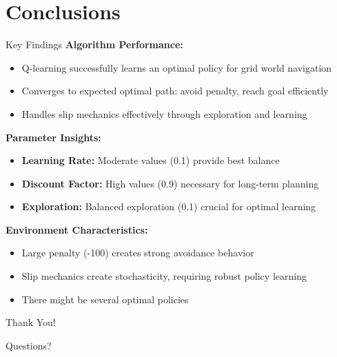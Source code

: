 \documentclass[aspectratio=169]{beamer}
\begin{document}
\section{Conclusions}

\begin{frame}{Key Findings}
    \textbf{Algorithm Performance:}
    \begin{itemize}
        \item Q-learning successfully learns an optimal policy for grid world navigation
        \item Converges to expected optimal path: avoid penalty, reach goal efficiently
        \item Handles slip mechanics effectively through exploration and learning
    \end{itemize}
    
    \vspace{0.5cm}
    \textbf{Parameter Insights:}
    \begin{itemize}
        \item \textbf{Learning Rate:} Moderate values (0.1) provide best balance
        \item \textbf{Discount Factor:} High values (0.9) necessary for long-term planning
        \item \textbf{Exploration:} Balanced exploration (0.1) crucial for optimal learning
    \end{itemize}
    
    \vspace{0.5cm}
    \textbf{Environment Characteristics:}
    \begin{itemize}
        \item Large penalty (-100) creates strong avoidance behavior
        \item Slip mechanics create stochasticity, requiring robust policy learning
        \item There might be several optimal policies
    \end{itemize}
\end{frame}

\begin{frame}
    \begin{center}
        \Huge{Thank You!}
        \vspace{1cm}
        
        \Large{Questions?}
        \vspace{1cm}
        
    \end{center}
\end{frame}
\end{document}
